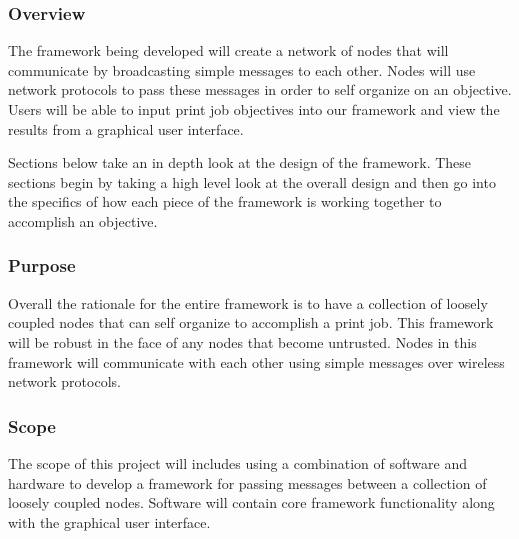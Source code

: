 



\subsubsection{Overview}
The framework being developed will create a network of nodes that will communicate by broadcasting simple messages to each other. Nodes will use network protocols to pass these messages in order to self organize on an objective. Users will be able to input print job objectives into our framework and view the results from a graphical user interface.

Sections below take an in depth look at the design of the framework. These sections begin by taking a high level look at the overall design and then go into the specifics of how each piece of the framework is working together to accomplish an objective.

\subsubsection{Purpose}
Overall the rationale for the entire framework is to have a collection of loosely coupled nodes that can self organize to accomplish a print job. This framework will be robust in the face of any nodes that become untrusted. Nodes in this framework will communicate with each other using simple messages over wireless network protocols. 

\subsubsection{Scope}
The scope of this project will includes using a combination of software and hardware to develop a framework for passing messages between a collection of loosely coupled nodes. Software will contain core framework functionality along with the graphical user interface. 

